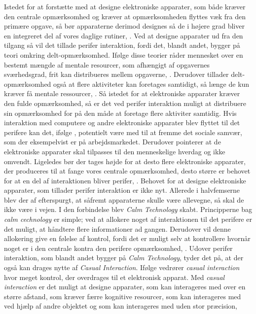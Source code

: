 Istedet for at forstætte med at designe elektroniske apparater, som både kræver den centrale opmærksomhed og kræver at opmærksomheden flyttes væk fra den primære opgave, så bør apparaterne derimod designes så de i højere grad bliver en integreret del af vores daglige rutiner, \parencite[s. 239]{PDF:PICharacteristicsAndConsiderations}. Ved at designe apparater ud fra den tilgang så vil det tillade perifer interaktion, fordi det, blandt andet, bygger på teori omkring delt-opmærksomhed. Ifølge disse teorier råder mennesket over en bestemt mængde af mentale resourcer, som afhængigt af opgavernes sværhedsgrad, frit kan distribueres mellem opgaverne, \parencite[s. 240]{PDF:PICharacteristicsAndConsiderations}. Derudover tillader delt-opmærksomhed også at flere aktiviteter kan foretages samtidigt, så længe de kun kræver få mentale ressourcer, \parencite[s. 2]{PDF:FacilitatingPIDesignAndEvaluation}. Så istedet for at elektroniske apparater kræver den fulde opmærksomhed, så er det ved perifer interaktion muligt at distribuere sin opmærksomhed for på den måde at foretage flere aktiviter samtidig. Hvis interaktion med computere og andre elektroniske apparater blev flyttet til det perifere kan det, ifølge \textcite[s. 11]{PDF:TheComputerWeiser}, potentielt være med til at fremme det sociale samvær, som der eksempelvist er på arbejdsmarkedet. Derudover pointerer \textcite[s. 11]{PDF:TheComputerWeiser} at de elektroniske apparater skal tilpasses til den menneskelige hverdag og ikke omvendt. Ligeledes bør der tages højde for at desto flere elektroniske apparater, der produceres til at fange vores centrale opmærksomhed, desto større er behovet for at en del af interaktionen bliver perifer, \parencite[s. 240]{PDF:PICharacteristicsAndConsiderations}. \blankline
%
Behovet for at designe elektroniske apparater, som tillader perifer interaktion er ikke nyt. Allerede i halvfemserne blev der af \textcite[s. 3]{PDF:TheComingAgeOfCalmTech} efterspurgt, at såfremt apparaterne skulle være allevegne, så skal de ikke være i vejen. I den forbindelse blev \textit{Calm Technology} skabt. Principperne bag \textit{calm cechnology} er simple; ved at allokere noget af interaktionen til det perifere er det muligt, at håndtere flere informationer ad gangen. Derudover vil denne allokering give en følelse af kontrol, fordi det er muligt selv at kontrollere hvornår noget er i den centrale kontra den perifere opmærksomhed, \parencite[s. 4]{PDF:TheComingAgeOfCalmTech}. Udover perifer interaktion, som blandt andet bygger på \textit{Calm Technology}, tyder det på, at der også kan drages nytte af \textit{Casual Interaction}. Ifølge \textcite[ss. 118-119]{PDF:PeripheralInteraction} vedrører \textit{casual interaction} hvor meget kontrol, der overdrages til et elektronisk apparat. Med \textit{casual interaction} er det muligt at designe apparater, som kan interageres med over en større afstand, som kræver færre kognitive resourcer, som kan interageres med ved hjælp af andre objektet og som kan interageres med uden stor præcision, \parencite[s. 128]{PDF:PeripheralInteraction}        
